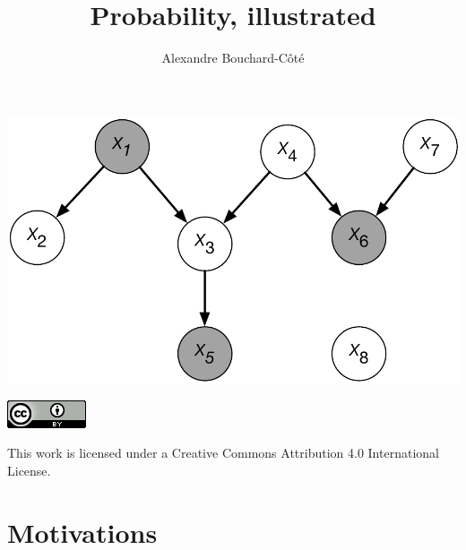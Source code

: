 \documentclass{article}
\title{Probability, illustrated}
\author{Alexandre Bouchard-C\^ot\'e}
\date{}
\begin{document}
\maketitle
\noindent\hrulefill
\vspace{0.5in}
\begin{center}
	\includegraphics[width=0.8\linewidth]{figures/graph-model-cond}
\end{center}
\vspace{0.5in}
\noindent\hrulefill
 \vspace{1.8in} 



\noindent\begin{minipage}{0.3\textwidth}%
	\includegraphics[width=\linewidth]{figures/logo}
\end{minipage}%
\hfill%
\begin{minipage}{0.6\textwidth}\raggedright
	This work is licensed under a Creative Commons Attribution 4.0 International License.
\end{minipage}


\newpage

\noindent\hrulefill
\tableofcontents
\noindent\hrulefill



\newpage


\section{Motivations}
\end{document}
